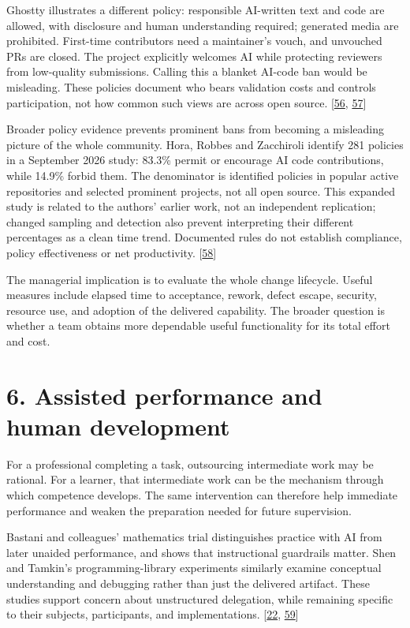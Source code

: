 Ghostty illustrates a different policy: responsible AI-written text and code are allowed, with disclosure and human understanding required; generated media are prohibited. First-time contributors need a maintainer's vouch, and unvouched PRs are closed. The project explicitly welcomes AI while protecting reviewers from low-quality submissions. Calling this a blanket AI-code ban would be misleading. These policies document who bears validation costs and controls participation, not how common such views are across open source. [\hyperlink{ref-ghosttypolicy2026}{56}, \hyperlink{ref-ghosttycontribution2026}{57}]


Broader policy evidence prevents prominent bans from becoming a misleading picture of the whole community. Hora, Robbes and Zacchiroli identify 281 policies in a September 2026 study: 83.3\% permit or encourage AI code contributions, while 14.9\% forbid them. The denominator is identified policies in popular active repositories and selected prominent projects, not all open source. This expanded study is related to the authors' earlier work, not an independent replication; changed sampling and detection also prevent interpreting their different percentages as a clean time trend. Documented rules do not establish compliance, policy effectiveness or net productivity. [\hyperlink{ref-horapolicies2026}{58}]


The managerial implication is to evaluate the whole change lifecycle. Useful measures include elapsed time to acceptance, rework, defect escape, security, resource use, and adoption of the delivered capability. The broader question is whether a team obtains more dependable useful functionality for its total effort and cost.



\section*{6. Assisted performance and human development}
For a professional completing a task, outsourcing intermediate work may be rational. For a learner, that intermediate work can be the mechanism through which competence develops. The same intervention can therefore help immediate performance and weaken the preparation needed for future supervision.


Bastani and colleagues' mathematics trial distinguishes practice with AI from later unaided performance, and shows that instructional guardrails matter. Shen and Tamkin's programming-library experiments similarly examine conceptual understanding and debugging rather than just the delivered artifact. These studies support concern about unstructured delegation, while remaining specific to their subjects, participants, and implementations. [\hyperlink{ref-bastani2025}{22}, \hyperlink{ref-shen2026}{59}]


